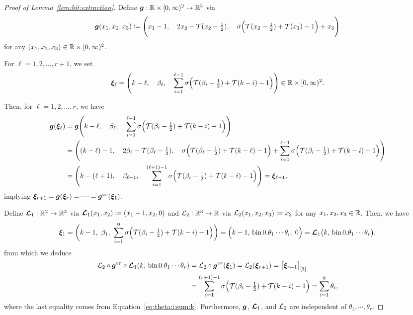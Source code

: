 \documentclass[nohyperref]{article}
\theoremstyle{plain}
\theoremstyle{definition}
\theoremstyle{remark}
\begin{document}
\begin{proof}[Proof of Lemma~\ref{lem:bit:extraction}]
Define $\bmg:\R\times [0,\infty)^2\to\R^3$ via
\begin{equation*}
	{\bm{g}}(x_1,x_2,x_3)
	\coloneqq \Bigg(x_1-1,\quad  2x_2 -{\mathcal{T}}(x_2-\tfrac{1}{2}),\quad 
	\sigma\Big({\mathcal{T}}(x_2-\tfrac{1}{2})+{\mathcal{T}}(x_1)-1\Big)+x_3
	\Bigg)
\end{equation*}
for any $(x_1,x_2,x_3)\in \R\times [0,\infty)^2$.


For $\ell=1,2,\dotsc,r+1$, we set
\begin{equation*}
	\bmxi_\ell=\Bigg(k-\ell,\quad  \beta_\ell,\quad   \sum_{i=1}^{\ell-1}\sigma\Big(\calT(\beta_i-\tfrac{1}{2})+\calT(k-i)-1\Big)\Bigg)\in \R\times [0,\infty)^2.
\end{equation*}

Then, for $\ell=1,2,\dotsc,r$, we have
\begin{equation*}
	\begin{split}
		{\bm{g}}({\bm{\xi}}_\ell)
		&={\bm{g}}\Bigg(k-\ell,\quad  \beta_\ell,\quad   \sum_{i=1}^{\ell-1}\sigma\Big({\mathcal{T}}(\beta_i-\tfrac{1}{2})+{\mathcal{T}}(k-i)-1\Big)\Bigg)\\
		&=	\Bigg((k-\ell)-1, \quad
		2\beta_\ell-{\mathcal{T}}(\beta_\ell-\tfrac{1}{2}), \quad
		\sigma\Big({\mathcal{T}}(\beta_\ell-\tfrac{1}{2})+{\mathcal{T}}(k-\ell)-1\Big)
		+
		\sum_{i=1}^{\ell-1}\sigma\Big({\mathcal{T}}(\beta_i-\tfrac{1}{2})+{\mathcal{T}}(k-i)-1\Big)
		\Bigg)\\
		&=	\Bigg(k-(\ell+1), \quad
		\beta_{\ell+1}, \quad
		\sum_{i=1}^{(\ell+1)-1}\sigma\Big({\mathcal{T}}(\beta_i-\tfrac{1}{2})+{\mathcal{T}}(k-i)-1\Big)\Bigg)={\bm{\xi}}_{\ell+1},
	\end{split}
\end{equation*}
implying ${\bm{\xi}}_{r+1}={\bm{g}}({\bm{\xi}}_{r})=\mathinner{\mkern-0.1mu\cdotp\mkern-0.3mu\cdotp\mkern-0.3mu\cdotp\mkern-0.1mu}={\bm{g}}^{\circ r}({\bm{\xi}}_1)$. 

Define $\bmcalL_1:\R^2 \to\R^3$ via ${\bm{\mathcal{L}}}_1(x_1,x_2)\coloneqq(x_1-1,x_2,0)$ and $\calL_2:\R^3\to\R$ via ${\mathcal{L}}_2(x_1,x_2,x_3)\coloneqq   x_3$ for any $x_1,x_2,x_3\in\R$. Then, 
we have 
\begin{equation*}
	\bmxi_1=\bigg(k-1,\ \beta_1,\ \sum_{i=1}^{0}\sigma\Big(\calT(\beta_i-\tfrac{1}{2})+\calT(k-i)-1\Big)\bigg)=\Big(k-1,\, \bin 0.\theta_1\cdots\theta_r,\, 0\Big)=\bmcalL_1\big(k,\,\bin 
 0.\theta_1\cdots\theta_r\big),
\end{equation*}
from which we deduce
\begin{equation*}
	\begin{split}
		{\mathcal{L}}_2\circ {\bm{g}}^{\circ r}\circ {\bm{\mathcal{L}}}_1(k,\, \textnormal{bin}\hspace{1.5pt} 
 0.\theta_1\mathinner{\mkern-0.1mu\cdotp\mkern-0.3mu\cdotp\mkern-0.3mu\cdotp\mkern-0.1mu}\theta_r)
		&= {\mathcal{L}}_2\circ {\bm{g}}^{\circ r}({\bm{\xi}}_1) 
		= {\mathcal{L}}_2({\bm{\xi}}_{r+1})=\big[{\bm{\xi}}_{r+1}\big]_{[3]}\\
		&= \sum_{i=1}^{(r+1)-1}\sigma\Big({\mathcal{T}}(\beta_i-\tfrac{1}{2})+{\mathcal{T}}(k-i)-1\Big)=\sum_{i=1}^k\theta_i,
	\end{split}
\end{equation*}
where the last equality comes from Equation~\eqref{eq:theta:i:sum:k}. Furthermore, ${\bm{g}}$, ${\bm{\mathcal{L}}}_1$, and ${\mathcal{L}}_2$ are independent of $\theta_1,\cdots,\theta_r$.


\end{proof}
\end{document}
